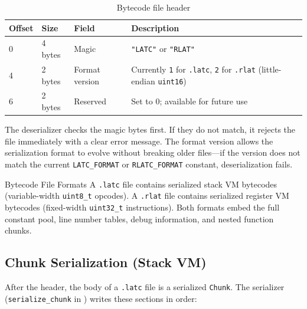 \begin{table}[h]
\centering
\caption{Bytecode file header}\label{tab:bytecode-header}
\begin{tabular}{@{} l l l p{5.5cm} @{}}
\toprule
\textbf{Offset} & \textbf{Size} & \textbf{Field} & \textbf{Description} \\
\midrule
0 & 4 bytes & Magic & \texttt{"LATC"} or \texttt{"RLAT"} \\
4 & 2 bytes & Format version & Currently \texttt{1} for \lstinline|.latc|, \texttt{2} for \lstinline|.rlat| (little-endian \lstinline|uint16|) \\
6 & 2 bytes & Reserved & Set to 0; available for future use \\
\bottomrule
\end{tabular}
\end{table}

The deserializer checks the magic bytes first. If they do not match, it rejects the file immediately with a clear error message. The format version allows the serialization format to evolve without breaking older files---if the version does not match the current \lstinline|LATC_FORMAT| or \lstinline|RLATC_FORMAT| constant, deserialization fails.

\begin{defnbox}{Bytecode File Formats}
A \lstinline|.latc| file contains serialized stack VM bytecodes (variable-width \lstinline|uint8_t| opcodes). A \lstinline|.rlat| file contains serialized register VM bytecodes (fixed-width \lstinline|uint32_t| instructions). Both formats embed the full constant pool, line number tables, debug information, and nested function chunks.
\end{defnbox}

\subsection{Chunk Serialization (Stack VM)}

After the header, the body of a \lstinline|.latc| file is a serialized \lstinline|Chunk|. The serializer (\lstinline|serialize_chunk| in ) writes these sections in order:

